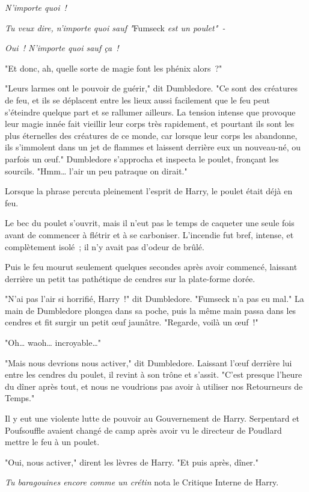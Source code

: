 \emph{N'importe quoi~!}

\emph{Tu veux dire, n'importe quoi sauf "}Fumseck \emph{est un poulet"~-}

\emph{Oui~! N'importe quoi sauf ça~!}

"Et donc, ah, quelle sorte de magie font les phénix alors~?"

"Leurs larmes ont le pouvoir de guérir," dit Dumbledore. "Ce sont des créatures de feu, et ils se déplacent entre les lieux aussi facilement que le feu peut s'éteindre quelque part et se rallumer ailleurs. La tension intense que provoque leur magie innée fait vieillir leur corps très rapidement, et pourtant ils sont les plus éternelles des créatures de ce monde, car lorsque leur corps les abandonne, ils s'immolent dans un jet de flammes et laissent derrière eux un nouveau-né, ou parfois un œuf." Dumbledore s'approcha et inspecta le poulet, fronçant les sourcils. "Hmm… l'air un peu patraque on dirait."

Lorsque la phrase percuta pleinement l'esprit de Harry, le poulet était déjà en feu.

Le bec du poulet s'ouvrit, mais il n'eut pas le temps de caqueter une seule fois avant de commencer à flétrir et à se carboniser. L'incendie fut bref, intense, et complètement isolé~; il n'y avait pas d'odeur de brûlé.

Puis le feu mourut seulement quelques secondes après avoir commencé, laissant derrière un petit tas pathétique de cendres sur la plate-forme dorée.

"N'ai pas l'air si horrifié, Harry~!" dit Dumbledore. "Fumseck n'a pas eu mal." La main de Dumbledore plongea dans sa poche, puis la même main passa dans les cendres et fit surgir un petit œuf jaunâtre. "Regarde, voilà un œuf~!"

"Oh… waoh… incroyable…"

"Mais nous devrions nous activer," dit Dumbledore. Laissant l'œuf derrière lui entre les cendres du poulet, il revint à son trône et s'assit. "C'est presque l'heure du dîner après tout, et nous ne voudrions pas avoir à utiliser nos Retourneurs de Temps."

Il y eut une violente lutte de pouvoir au Gouvernement de Harry. Serpentard et Poufsouffle avaient changé de camp après avoir vu le directeur de Poudlard mettre le feu à un poulet.

"Oui, nous activer," dirent les lèvres de Harry. "Et puis après, dîner."

\emph{Tu baragouines encore comme un crétin} nota le Critique Interne de Harry.

